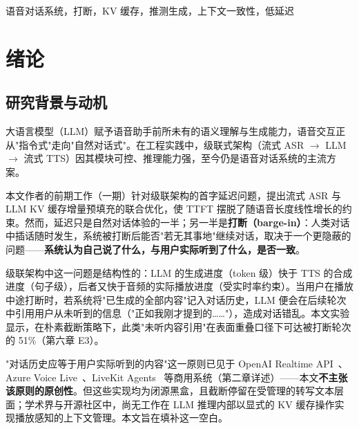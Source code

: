 \documentclass[conference]{IEEEtran}
\theoremstyle{definition}
\begin{document}
\begin{IEEEkeywords}
语音对话系统，打断，KV 缓存，推测生成，上下文一致性，低延迟
\end{IEEEkeywords}

\section{绪论}

\subsection{研究背景与动机}
大语言模型（LLM）赋予语音助手前所未有的语义理解与生成能力，语音交互正从"指令式"走向"自然对话式"。在工程实践中，级联式架构（流式 ASR $\rightarrow$ LLM $\rightarrow$ 流式 TTS）因其模块可控、推理能力强，至今仍是语音对话系统的主流方案。

本文作者的前期工作（一期）针对级联架构的首字延迟问题，提出流式 ASR 与 LLM KV 缓存增量预填充的联合优化，使 TTFT 摆脱了随语音长度线性增长的约束。然而，延迟只是自然对话体验的一半；另一半是\textbf{打断（barge-in）}：人类对话中插话随时发生，系统被打断后能否"若无其事地"继续对话，取决于一个更隐蔽的问题——\textbf{系统认为自己说了什么，与用户实际听到了什么，是否一致}。

级联架构中这一问题是结构性的：LLM 的生成进度（token 级）快于 TTS 的合成进度（句子级），后者又快于音频的实际播放进度（受实时率约束）。当用户在播放中途打断时，若系统将"已生成的全部内容"记入对话历史，LLM 便会在后续轮次中引用用户从未听到的信息（"正如我刚才提到的……"），造成对话错乱。本文实验显示，在朴素截断策略下，此类"未听内容引用"在表面重叠口径下可达被打断轮次的 51\%（第六章 E3）。

"对话历史应等于用户实际听到的内容"这一原则已见于 OpenAI Realtime API~\cite{openai_realtime}、Azure Voice Live~\cite{azure_voicelive}、LiveKit Agents~\cite{livekit_agents} 等商用系统（第二章详述）——本文\textbf{不主张该原则的原创性}。但这些实现均为闭源黑盒，且截断停留在受管理的转写文本层面；学术界与开源社区中，尚无工作在 LLM 推理内部以显式的 KV 缓存操作实现播放感知的上下文管理。本文旨在填补这一空白。
\end{document}
